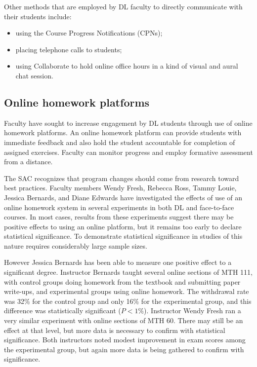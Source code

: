 Other methods that are employed by DL faculty to directly communicate with their
students include:
\begin{itemize}
	\item using the Course Progress Notifications (CPNs);
	\item placing telephone calls to students;
	\item using Collaborate to hold online office hours in a kind of visual and aural chat session.
\end{itemize}

\subsection{Online homework platforms}
Faculty have sought to increase engagement by DL students through use of online
homework platforms. An online homework platform can provide students with
immediate feedback and also hold the student accountable for completion of
assigned exercises. Faculty can monitor progress and employ formative assessment
from a distance.

The SAC recognizes that program changes should come from research toward best
practices.  Faculty members Wendy Fresh, Rebecca Ross, Tammy Louie, Jessica
Bernards, and Diane Edwards have investigated the effects of use of an online
homework system in several experiments in both DL and face-to-face courses. In most
cases, results from these experiments suggest there may be positive effects to
using an online platform, but it remains too early to declare statistical
significance. To demonstrate statistical significance in studies of this nature
requires considerably large sample sizes.

However Jessica Bernards has been able to measure one positive effect to a
significant degree. Instructor Bernards taught several online sections of MTH
111, with control groups doing homework from the textbook and submitting paper
write-ups, and experimental groups using online homework. The withdrawal rate
was 32\% for the control group and only 16\% for the experimental group, and
this difference was statistically significant ($P<1\%$).  Instructor Wendy Fresh
ran a very similar experiment with online sections of MTH 60. There may still be
an effect at that level, but more data is necessary to confirm with statistical
significance. Both instructors noted modest improvement in exam scores among the
experimental group, but again more data is being gathered to confirm with
significance.

